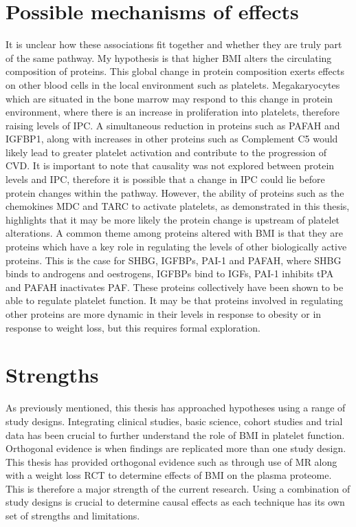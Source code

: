 \documentclass[11pt,twoside]{bristolthesis}
\begin{document}
\hypertarget{possible-mechanisms-of-effects}{%
\section{Possible mechanisms of effects}\label{possible-mechanisms-of-effects}}

It is unclear how these associations fit together and whether they are truly part of the same pathway. My hypothesis is that higher BMI alters the circulating composition of proteins. This global change in protein composition exerts effects on other blood cells in the local environment such as platelets. Megakaryocytes which are situated in the bone marrow may respond to this change in protein environment, where there is an increase in proliferation into platelets, therefore raising levels of IPC. A simultaneous reduction in proteins such as PAFAH and IGFBP1, along with increases in other proteins such as Complement C5 would likely lead to greater platelet activation and contribute to the progression of CVD. It is important to note that causality was not explored between protein levels and IPC, therefore it is possible that a change in IPC could lie before protein changes within the pathway. However, the ability of proteins such as the chemokines MDC and TARC to activate platelets, as demonstrated in this thesis, highlights that it may be more likely the protein change is upstream of platelet alterations. A common theme among proteins altered with BMI is that they are proteins which have a key role in regulating the levels of other biologically active proteins. This is the case for SHBG, IGFBPs, PAI-1 and PAFAH, where SHBG binds to androgens and oestrogens, IGFBPs bind to IGFs, PAI-1 inhibits tPA and PAFAH inactivates PAF. These proteins collectively have been shown to be able to regulate platelet function. It may be that proteins involved in regulating other proteins are more dynamic in their levels in response to obesity or in response to weight loss, but this requires formal exploration.

\hypertarget{strengths}{%
\section{Strengths}\label{strengths}}

As previously mentioned, this thesis has approached hypotheses using a range of study designs. Integrating clinical studies, basic science, cohort studies and trial data has been crucial to further understand the role of BMI in platelet function. Orthogonal evidence is when findings are replicated more than one study design. This thesis has provided orthogonal evidence such as through use of MR along with a weight loss RCT to determine effects of BMI on the plasma proteome. This is therefore a major strength of the current research. Using a combination of study designs is crucial to determine causal effects as each technique has its own set of strengths and limitations.
\end{document}
